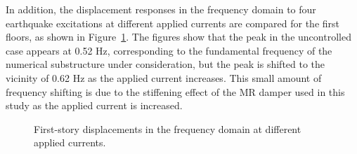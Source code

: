 In addition, the displacement responses in the frequency domain to four earthquake excitations at different applied currents are compared for the first floors, as shown in Figure~\ref{fig:8-18}. The figures show that the peak in the uncontrolled case appears at 0.52 Hz, corresponding to the fundamental frequency of the numerical substructure under consideration, but the peak is shifted to the vicinity of 0.62 Hz as the applied current increases. This small amount of frequency shifting is due to the stiffening effect of the MR damper used in this study as the applied current is increased.

\begin{figure}[H]
\centering
{}
\caption{First-story displacements in the frequency domain at different applied currents.}
\label{fig:8-18}
\end{figure}

